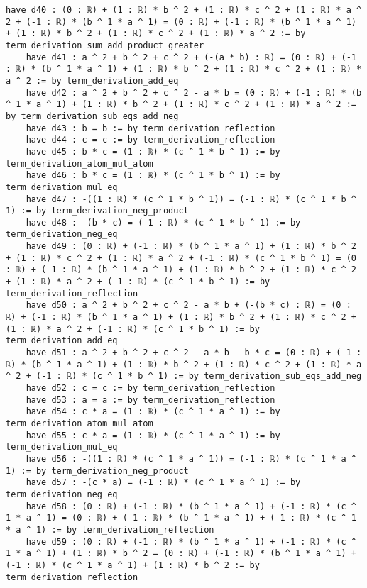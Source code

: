 \documentclass{article}
\begin{document}
\begin{tcolorbox}[colback=white!10, width=\linewidth]
\begin{lstlisting}[language=Lean4]
    have d40 : (0 : ℝ) + (1 : ℝ) * b ^ 2 + (1 : ℝ) * c ^ 2 + (1 : ℝ) * a ^ 2 + (-1 : ℝ) * (b ^ 1 * a ^ 1) = (0 : ℝ) + (-1 : ℝ) * (b ^ 1 * a ^ 1) + (1 : ℝ) * b ^ 2 + (1 : ℝ) * c ^ 2 + (1 : ℝ) * a ^ 2 := by term_derivation_sum_add_product_greater
    have d41 : a ^ 2 + b ^ 2 + c ^ 2 + (-(a * b) : ℝ) = (0 : ℝ) + (-1 : ℝ) * (b ^ 1 * a ^ 1) + (1 : ℝ) * b ^ 2 + (1 : ℝ) * c ^ 2 + (1 : ℝ) * a ^ 2 := by term_derivation_add_eq
    have d42 : a ^ 2 + b ^ 2 + c ^ 2 - a * b = (0 : ℝ) + (-1 : ℝ) * (b ^ 1 * a ^ 1) + (1 : ℝ) * b ^ 2 + (1 : ℝ) * c ^ 2 + (1 : ℝ) * a ^ 2 := by term_derivation_sub_eqs_add_neg
    have d43 : b = b := by term_derivation_reflection
    have d44 : c = c := by term_derivation_reflection
    have d45 : b * c = (1 : ℝ) * (c ^ 1 * b ^ 1) := by term_derivation_atom_mul_atom
    have d46 : b * c = (1 : ℝ) * (c ^ 1 * b ^ 1) := by term_derivation_mul_eq
    have d47 : -((1 : ℝ) * (c ^ 1 * b ^ 1)) = (-1 : ℝ) * (c ^ 1 * b ^ 1) := by term_derivation_neg_product
    have d48 : -(b * c) = (-1 : ℝ) * (c ^ 1 * b ^ 1) := by term_derivation_neg_eq
    have d49 : (0 : ℝ) + (-1 : ℝ) * (b ^ 1 * a ^ 1) + (1 : ℝ) * b ^ 2 + (1 : ℝ) * c ^ 2 + (1 : ℝ) * a ^ 2 + (-1 : ℝ) * (c ^ 1 * b ^ 1) = (0 : ℝ) + (-1 : ℝ) * (b ^ 1 * a ^ 1) + (1 : ℝ) * b ^ 2 + (1 : ℝ) * c ^ 2 + (1 : ℝ) * a ^ 2 + (-1 : ℝ) * (c ^ 1 * b ^ 1) := by term_derivation_reflection
    have d50 : a ^ 2 + b ^ 2 + c ^ 2 - a * b + (-(b * c) : ℝ) = (0 : ℝ) + (-1 : ℝ) * (b ^ 1 * a ^ 1) + (1 : ℝ) * b ^ 2 + (1 : ℝ) * c ^ 2 + (1 : ℝ) * a ^ 2 + (-1 : ℝ) * (c ^ 1 * b ^ 1) := by term_derivation_add_eq
    have d51 : a ^ 2 + b ^ 2 + c ^ 2 - a * b - b * c = (0 : ℝ) + (-1 : ℝ) * (b ^ 1 * a ^ 1) + (1 : ℝ) * b ^ 2 + (1 : ℝ) * c ^ 2 + (1 : ℝ) * a ^ 2 + (-1 : ℝ) * (c ^ 1 * b ^ 1) := by term_derivation_sub_eqs_add_neg
    have d52 : c = c := by term_derivation_reflection
    have d53 : a = a := by term_derivation_reflection
    have d54 : c * a = (1 : ℝ) * (c ^ 1 * a ^ 1) := by term_derivation_atom_mul_atom
    have d55 : c * a = (1 : ℝ) * (c ^ 1 * a ^ 1) := by term_derivation_mul_eq
    have d56 : -((1 : ℝ) * (c ^ 1 * a ^ 1)) = (-1 : ℝ) * (c ^ 1 * a ^ 1) := by term_derivation_neg_product
    have d57 : -(c * a) = (-1 : ℝ) * (c ^ 1 * a ^ 1) := by term_derivation_neg_eq
    have d58 : (0 : ℝ) + (-1 : ℝ) * (b ^ 1 * a ^ 1) + (-1 : ℝ) * (c ^ 1 * a ^ 1) = (0 : ℝ) + (-1 : ℝ) * (b ^ 1 * a ^ 1) + (-1 : ℝ) * (c ^ 1 * a ^ 1) := by term_derivation_reflection
    have d59 : (0 : ℝ) + (-1 : ℝ) * (b ^ 1 * a ^ 1) + (-1 : ℝ) * (c ^ 1 * a ^ 1) + (1 : ℝ) * b ^ 2 = (0 : ℝ) + (-1 : ℝ) * (b ^ 1 * a ^ 1) + (-1 : ℝ) * (c ^ 1 * a ^ 1) + (1 : ℝ) * b ^ 2 := by term_derivation_reflection

\end{lstlisting}
\end{tcolorbox}
\end{document}
